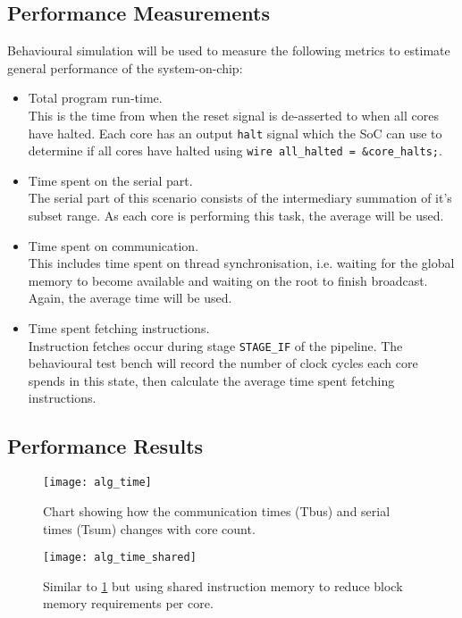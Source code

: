 \subsection{Performance Measurements}
Behavioural simulation will be used to measure the following metrics to estimate general performance of the system-on-chip:
\begin{itemize}
\item Total program run-time.\\This is the time from when the reset signal is de-asserted to when all cores have halted. Each core has an output \verb|halt| signal which the SoC can use to determine if all cores have halted using \verb|wire all_halted = &core_halts;|. 

\item Time spent on the serial part.\\The serial part of this scenario consists of the intermediary summation of it's subset range. As each core is performing this task, the average will be used.

\item Time spent on communication.\\This includes time spent on thread synchronisation, i.e. waiting for the global memory to become available and waiting on the root to finish broadcast. Again, the average time will be used.

\item Time spent fetching instructions.\\Instruction fetches occur during stage \verb|STAGE_IF| of the pipeline. The behavioural test bench will record the number of clock cycles each core spends in this state, then calculate the average time spent fetching instructions. 
\end{itemize}

\subsection{Performance Results}
\begin{figure}[h]
\centering
\texttt{[image: alg\_time]}
\caption{Chart showing how the communication times (Tbus) and serial times (Tsum) changes with core count.}
\label{fig:alg_time}
\end{figure}

\begin{figure}[h]
\centering
\texttt{[image: alg\_time\_shared]}
\caption{Similar to \cref{fig:alg_time} but using shared instruction memory to reduce block memory requirements per core.}
\label{fig:alg_time_shared}
\end{figure}















